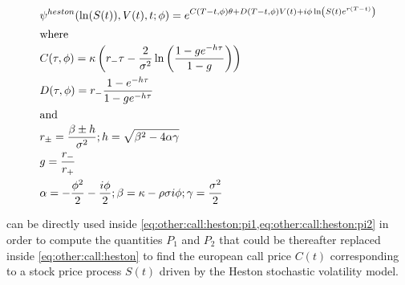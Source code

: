 \documentclass[12pt]{report}
\begin{document}
\begin{align}
  &\psi^{heston}(\ln(S(t)),V(t),t;\phi) = e^{C(T-t, \phi)\theta + D(T-t, \phi)V(t) + i\phi\ln\left(S(t)e^{r(T-t)}\right)} \label{eq:other:heston:psi} \\
  \intertext{where}
  &C(\tau, \phi) = \kappa \left(r_{-} \tau - \frac{2}{\sigma^2}\ln\left(\frac{1 - g e^{-h\tau}}{1 - g}\right)\right) \notag \\
  &D(\tau, \phi) = r_{-}\frac{1 - e^{-h\tau}}{1 - ge^{-h\tau}} \notag \\ 
  \intertext{and}
  &r_{\pm} = \frac{\beta \pm h}{\sigma^2}; h = \sqrt{\beta^2 - 4\alpha\gamma} \notag \\
  &g = \frac{r_{-}}{r_{+}} \notag \\
  &\alpha = -\frac{\phi^2}{2} - \frac{i\phi}{2}; \beta = \kappa - \rho\sigma i\phi; \gamma = \frac{\sigma^2}{2} \notag
\end{align}

 can be directly used inside \cref{eq:other:call:heston:pi1,eq:other:call:heston:pi2} in order to compute the quantities $P_1$ and $P_2$ that could be thereafter replaced inside \cref{eq:other:call:heston} to find the european call price  $C(t)$ corresponding to a stock price process $S(t)$ driven by the Heston stochastic volatility model.
\end{document}
